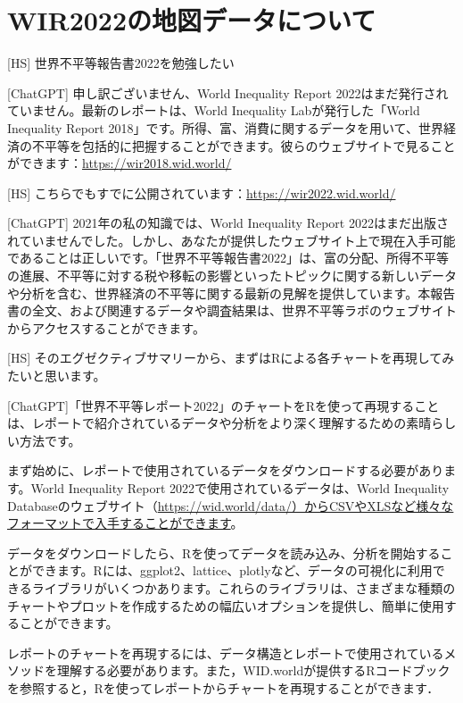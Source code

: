 \documentclass[
]{book}
\theoremstyle{definition}
\theoremstyle{definition}
\theoremstyle{definition}
\theoremstyle{definition}
\theoremstyle{remark}
\begin{document}
\hypertarget{mapdataofwir2022j}{%
\section{WIR2022の地図データについて}\label{mapdataofwir2022j}}

{[}HS{]} 世界不平等報告書2022を勉強したい

{[}ChatGPT{]} 申し訳ございません、World Inequality Report 2022はまだ発行されていません。最新のレポートは、World Inequality Labが発行した「World Inequality Report 2018」です。所得、富、消費に関するデータを用いて、世界経済の不平等を包括的に把握することができます。彼らのウェブサイトで見ることができます：\url{https://wir2018.wid.world/}

{[}HS{]} こちらでもすでに公開されています：\url{https://wir2022.wid.world/}

{[}ChatGPT{]} 2021年の私の知識では、World Inequality Report 2022はまだ出版されていませんでした。しかし、あなたが提供したウェブサイト上で現在入手可能であることは正しいです。「世界不平等報告書2022」は、富の分配、所得不平等の進展、不平等に対する税や移転の影響といったトピックに関する新しいデータや分析を含む、世界経済の不平等に関する最新の見解を提供しています。本報告書の全文、および関連するデータや調査結果は、世界不平等ラボのウェブサイトからアクセスすることができます。

{[}HS{]} そのエグゼクティブサマリーから、まずはRによる各チャートを再現してみたいと思います。

{[}ChatGPT{]}「世界不平等レポート2022」のチャートをRを使って再現することは、レポートで紹介されているデータや分析をより深く理解するための素晴らしい方法です。

まず始めに、レポートで使用されているデータをダウンロードする必要があります。World Inequality Report 2022で使用されているデータは、World Inequality Databaseのウェブサイト（\url{https://wid.world/data/）からCSVやXLSなど様々なフォーマットで入手することができます}。

データをダウンロードしたら、Rを使ってデータを読み込み、分析を開始することができます。Rには、ggplot2、lattice、plotlyなど、データの可視化に利用できるライブラリがいくつかあります。これらのライブラリは、さまざまな種類のチャートやプロットを作成するための幅広いオプションを提供し、簡単に使用することができます。

レポートのチャートを再現するには、データ構造とレポートで使用されているメソッドを理解する必要があります。また，WID.worldが提供するRコードブックを参照すると，Rを使ってレポートからチャートを再現することができます．
\end{document}
